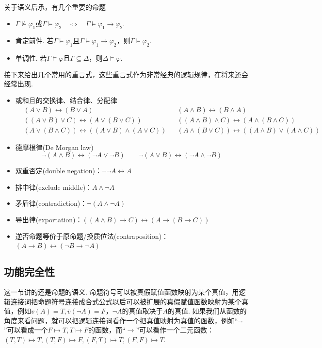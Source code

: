 关于语义后承，有几个重要的命题
\begin{itemize}
    \item \(\Gamma \not \vDash \varphi_1 \mbox{或} \Gamma \vDash \varphi_2 \quad \Longleftrightarrow \quad \Gamma \vDash \varphi_1 \to \varphi_2\).
    \item 肯定前件. 若\(\Gamma \vDash \varphi_1\)且\(\Gamma \vDash \varphi_1 \to \varphi_2\)，则\(\Gamma \vDash \varphi_2\).
    \item 单调性. 若\(\Gamma \vDash \varphi\)且\(\Gamma \subseteq \Delta\)，则\(\Delta \vDash \varphi\).
\end{itemize}

接下来给出几个常用的重言式，这些重言式作为非常经典的逻辑规律，在将来还会经常出现.
\begin{itemize}
    \item 或和且的交换律、结合律、分配律
    \begin{align*}
        & (A \vee B) \leftrightarrow (B \vee A) && (A \wedge B) \leftrightarrow (B \wedge A) \\
        & ((A \vee B) \vee C) \leftrightarrow (A \vee (B \vee C)) && ((A \wedge B) \wedge C) \leftrightarrow (A \wedge (B \wedge C)) \\
        & (A \vee (B \wedge C)) \leftrightarrow ((A \vee B) \wedge (A \vee C)) && (A \wedge (B \vee C)) \leftrightarrow ((A \wedge B) \vee (A \wedge C))
    \end{align*}
    \item 德摩根律(De Morgan law)
    \[\neg(A \wedge B) \leftrightarrow (\neg A \vee \neg B) \qquad \neg (A \vee B) \leftrightarrow (\neg A \wedge \neg B)\]
    \item 双重否定(double negation)：\(\neg \neg A \leftrightarrow A\)
    \item 排中律(exclude middle)：\(A \wedge \neg A\)
    \item 矛盾律(contradiction)：\(\neg (A \wedge \neg A)\)
    \item 导出律(exportation)：\(((A \wedge B) \to C) \leftrightarrow (A \to (B \to C))\)
    \item 逆否命题等价于原命题/换质位法(contraposition)：\((A \to B) \leftrightarrow (\neg B \to \neg A)\)
\end{itemize}


\subsection{功能完全性}

这一节讲的还是命题的语义. 命题符号可以被真假赋值函数映射为某个真值，用逻辑连接词把命题符号连接成合式公式以后可以被扩展的真假赋值函数映射为某个真值，例如\(v(A)=T,\bar{v}(\neg A)=F\)，\(\neg A\)的真值取决于\(A\)的真值. 如果我们从函数的角度来看问题，就可以把逻辑连接词看作一个把真值映射为真值的函数，例如“\(\neg\)”可以看成一个\(F \mapsto T, T \mapsto F\)的函数，而“\(\to\)”可以看作一个二元函数：\((T,T) \mapsto T, (T,F) \mapsto F, (F,T) \mapsto T, (F,F) \mapsto T\). 


